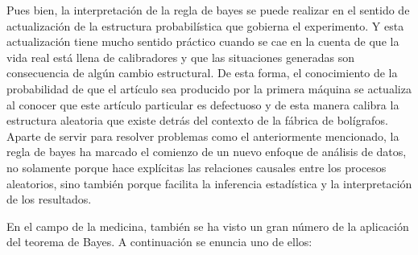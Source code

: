 \begin{Eje}
Pues bien, la interpretación de la regla de bayes se puede realizar en el sentido de actualización de la estructura probabilística que gobierna el experimento. Y esta actualización tiene mucho sentido práctico cuando se cae en la cuenta de que la vida real está llena de calibradores y que las situaciones generadas son consecuencia de algún cambio estructural. De esta forma, el conocimiento de la probabilidad de que el artículo sea producido por la primera máquina se actualiza al conocer que este artículo particular es defectuoso y de esta manera calibra la estructura aleatoria que existe detrás del contexto de la fábrica de bolígrafos. Aparte de servir para resolver problemas como el anteriormente mencionado, la regla de bayes ha marcado el comienzo de un nuevo enfoque de análisis de datos, no solamente porque hace explícitas las relaciones causales entre los procesos aleatorios, sino también porque facilita la inferencia estadística y la interpretación de los resultados.
\end{Eje}

En el campo de la medicina, también se ha visto un gran número de la aplicación del teorema de Bayes. A continuación se enuncia uno de ellos:

